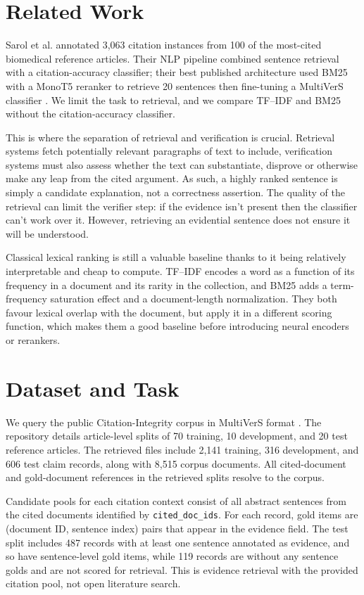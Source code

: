 \documentclass[11pt]{article}
\begin{document}
\section{Related Work}
Sarol et al. annotated 3,063 citation instances from 100 of the most-cited biomedical reference articles. Their NLP pipeline combined sentence retrieval with a citation-accuracy classifier; their best published architecture used BM25 with a MonoT5 reranker to retrieve 20 sentences then fine-tuning a MultiVerS classifier \cite{sarol2024}. We limit the task to retrieval, and we compare TF--IDF and BM25 without the citation-accuracy classifier.

This is where the separation of retrieval and verification is crucial. Retrieval systems fetch potentially relevant paragraphs of text to include, verification systems must also assess whether the text can substantiate, disprove or otherwise make any leap from the cited argument. As such, a highly ranked sentence is simply a candidate explanation, not a correctness assertion. The quality of the retrieval can limit the verifier step: if the evidence isn't present then the classifier can't work over it. However, retrieving an evidential sentence does not ensure it will be understood.

Classical lexical ranking is still a valuable baseline thanks to it being relatively interpretable and cheap to compute. TF--IDF encodes a word as a function of its frequency in a document and its rarity in the collection, and BM25 adds a term-frequency saturation effect and a document-length normalization. They both favour lexical overlap with the document, but apply it in a different scoring function, which makes them a good baseline before introducing neural encoders or rerankers.

\section{Dataset and Task}
We query the public Citation-Integrity corpus in MultiVerS format \cite {citationintegrityrepo}. The repository details article-level splits of 70 training, 10 development, and 20 test reference articles. The retrieved files include 2,141 training, 316 development, and 606 test claim records, along with 8,515 corpus documents. All cited-document and gold-document references in the retrieved splits resolve to the corpus.

Candidate pools for each citation context consist of all abstract sentences from the cited documents identified by \texttt{cited\_doc\_ids}. For each record, gold items are (document ID, sentence index) pairs that appear in the evidence field. The test split includes 487 records with at least one sentence annotated as evidence, and so have sentence-level gold items, while 119 records are without any sentence golds and are not scored for retrieval. This is evidence retrieval with the provided citation pool, not open literature search.
\end{document}
